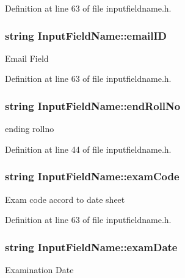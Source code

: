 Definition at line 63 of file inputfieldname.\-h.

\hypertarget{classInputFieldName_a05541618feaaebe7a3f74b0bf8fa74b9}{
\subsubsection[{email\-I\-D}]{\setlength{\rightskip}{0pt plus 5cm}string Input\-Field\-Name\-::email\-I\-D}}\label{classInputFieldName_a05541618feaaebe7a3f74b0bf8fa74b9}
Email Field 

Definition at line 63 of file inputfieldname.\-h.

\hypertarget{classInputFieldName_a06435f9ba5a529cbba4ee1ce9b02e5cc}{
\subsubsection[{end\-Roll\-No}]{\setlength{\rightskip}{0pt plus 5cm}string Input\-Field\-Name\-::end\-Roll\-No}}\label{classInputFieldName_a06435f9ba5a529cbba4ee1ce9b02e5cc}
ending rollno 

Definition at line 44 of file inputfieldname.\-h.

\hypertarget{classInputFieldName_a3cc09a852d20e96bb4908b9f66c01ed7}{
\subsubsection[{exam\-Code}]{\setlength{\rightskip}{0pt plus 5cm}string Input\-Field\-Name\-::exam\-Code}}\label{classInputFieldName_a3cc09a852d20e96bb4908b9f66c01ed7}
Exam code accord to date sheet 

Definition at line 63 of file inputfieldname.\-h.

\hypertarget{classInputFieldName_a4e60d793497c36b2d80e2411cbb915d8}{
\subsubsection[{exam\-Date}]{\setlength{\rightskip}{0pt plus 5cm}string Input\-Field\-Name\-::exam\-Date}}\label{classInputFieldName_a4e60d793497c36b2d80e2411cbb915d8}
Examination Date 

